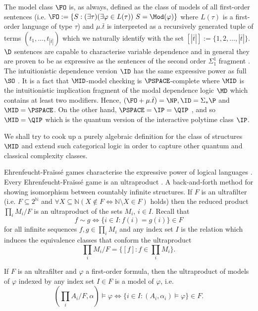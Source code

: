 \documentclass[10.5pt]{article}
\begin{document}
The model class $\FO$ is, as always, defined as the class of models of all first-order sentences (i.e. $\FO:= \{S:(\exists\tau)(\exists\varphi\in L(\tau))\ S=\Mod(\varphi)\}$ where $L(\tau)$ is a first-order language of type $\tau$) and $\mu.\bar{t}$ is interpreted as a recursively generated tuple of terms $(t_1,\dots,t_{|\bar{t}|})$ which we naturally identify with the set $[|\bar{t}|] := \{1,2,\dots,|\bar{t}|\}$. $\D$ sentences are capable to characterise variable dependence and in general they are proven to be as expressive as the sentences of the second order $\Sigma_1^1$ fragment \cite{dep}. The intuitionistic dependence version $\ID$ has the same expressive power as full $\SO$ \cite{dep}. It is a fact that $\MID$-model checking is $\PSPACE$-complete \cite{dep} where $\MID$ is the intuitionistic implication fragment of the modal dependence logic $\MD$ which contains at least two modifiers. Hence, $(\FO + \mu.\bar{t}) = \NP, \ID = \Sigma_{\ast}\P$ and $\MID = \PSPACE$.  On the other hand, $\PSPACE = \IP = \QIP$ \cite{qip}, and so $\MID = \QIP$ which is the quantum version of the interactive polytime class $\IP$.

We shall try to cook up a purely algebraic definition for the class of structures $\MID$ and extend such categorical logic in order to capture other quantum and classical complexity classes. 

Ehrenfeucht-Fra\"iss\'e games characterise the expressive power of logical languages \cite{ams}. Every Ehrenfeucht-Fra\"iss\'e game is an ultraproduct \cite{models}. A back-and-forth method for showing isomorphism between countably infinite structures. If $F$ is an ultrafilter (i.e. $F\subseteq 2^{\mathbb{N}}$ and $\forall X\subseteq\mathbb{N} (X\notin F \Leftrightarrow \mathbb{N}\setminus X\in F)$ holds) then the reduced product $\prod_{i}M_i / F$ is an ultraproduct of the sets $M_i$, $i\in I$. Recall that \[f\sim g \Leftrightarrow \{i\in I : f(i) = g(i)\}\in F\] for all infinite sequences $f,g\in\prod_i M_i$ and any index set $I$ is the relation which induces the equivalence classes that conform the ultraproduct \[\prod_{i}M_i / F = \{[f]:f\in\prod_i M_i\}.\] 

\begin{lem}
If $F$ is an ultrafilter and $\varphi$ a first-order formula, then the ultraproduct of models of $\varphi$ indexed by any index set $I\in F$ is a model of $\varphi$, i.e. \[(\prod_i A_i / F , \alpha)\models\varphi\Leftrightarrow\{i\in I: (A_i, \alpha_i)\models\varphi\}\in F.\]
\end{lem}
\end{document}

